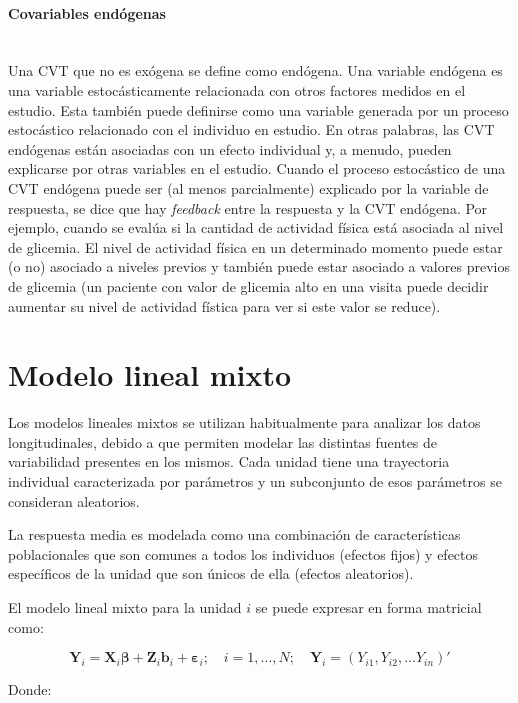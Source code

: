 \documentclass[spanish]{article}
\numberwithin{figure}{subsection}
\numberwithin{equation}{subsection}
\numberwithin{table}{subsection}
\begin{document}
\paragraph{Covariables endógenas} \mbox{} \\

Una CVT que no es exógena se define como endógena. Una variable endógena es una
variable estocásticamente relacionada con otros factores medidos en el estudio.
Esta también puede definirse como una variable generada por un proceso
estocástico relacionado con el individuo en estudio. En otras palabras, las CVT
endógenas están asociadas con un efecto individual y, a menudo, pueden
explicarse por otras variables en el estudio. Cuando el proceso estocástico de
una CVT endógena puede ser (al menos parcialmente) explicado por la variable de
respuesta, se dice que hay \textit{feedback} entre la respuesta y la CVT
endógena. Por ejemplo, cuando se evalúa si la cantidad de actividad física está
asociada al nivel de glicemia. El nivel de actividad física en un determinado
momento puede estar (o no) asociado a niveles previos y también puede estar
asociado a valores previos de glicemia (un paciente con valor de glicemia alto
en una visita puede decidir aumentar su nivel de actividad fística para ver si
este valor se reduce).

\section{Modelo lineal mixto}

Los modelos lineales mixtos se utilizan habitualmente para analizar los datos
longitudinales, debido a que permiten modelar las distintas fuentes de
variabilidad presentes en los mismos. Cada unidad tiene una trayectoria
individual caracterizada por parámetros y un subconjunto de esos parámetros se
consideran aleatorios.

La respuesta media es modelada como una combinación de características
poblacionales que son comunes a todos los individuos (efectos fijos) y efectos
específicos de la unidad que son únicos de ella (efectos aleatorios).

El modelo lineal mixto para la unidad $i$ se puede expresar en forma matricial
como:

\[
	\bm{Y}_i = \bm{X}_i\bm{\beta} + \bm{Z}_i\bm{b}_i + \bm{\varepsilon}_i;
	\quad i = 1, ..., N;
	\quad \bm{Y}_i = (Y_{i1}, Y_{i2}, ... Y_{in})'
\]

Donde:
\end{document}
